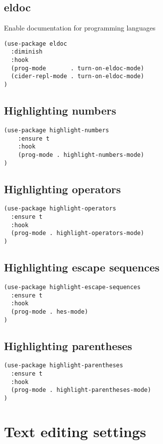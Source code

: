 \documentclass[11pt]{article}
\begin{document}
\subsection*{eldoc}
\label{sec:org6370ecf}

Enable documentation for programming languages

\begin{verbatim}
(use-package eldoc
  :diminish
  :hook
  (prog-mode       . turn-on-eldoc-mode)
  (cider-repl-mode . turn-on-eldoc-mode)
)
\end{verbatim}

\subsection*{Highlighting numbers}
\label{sec:org00a8a31}
\begin{verbatim}
(use-package highlight-numbers
    :ensure t
    :hook
    (prog-mode . highlight-numbers-mode)
)
\end{verbatim}
\subsection*{Highlighting operators}
\label{sec:orgbea0089}
\begin{verbatim}
(use-package highlight-operators
  :ensure t
  :hook
  (prog-mode . highlight-operators-mode)
)
\end{verbatim}
\subsection*{Highlighting escape sequences}
\label{sec:org4113a14}

\begin{verbatim}
(use-package highlight-escape-sequences
  :ensure t
  :hook
  (prog-mode . hes-mode)
)
\end{verbatim}
\subsection*{Highlighting parentheses}
\label{sec:org6f205bd}

\begin{verbatim}
(use-package highlight-parentheses
  :ensure t
  :hook
  (prog-mode . highlight-parentheses-mode)
)
\end{verbatim}


\section*{Text editing settings}
\label{sec:org244ae89}
\end{document}
